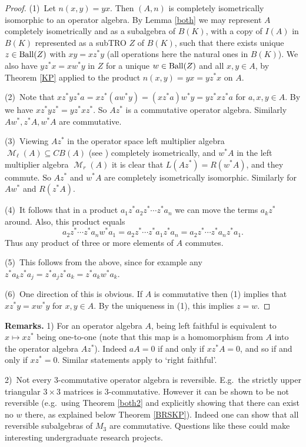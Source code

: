 \documentclass{amsart}
\theoremstyle{remark}
\theoremstyle{definition}
\numberwithin{equation}{section}
\DeclareMathOperator{\cM}{{\mathcal M}}
\begin{document}
\begin{proof}  (1)\ Let $n(x,y) = yx$.  Then $(A,n)$ is completely isometrically isomorphic to an operator algebra. By Lemma \ref{both}
we may represent 
$A$ completely isometrically and as a subalgebra of $B(K)$, with a copy of 
$I(A)$ in $B(K)$ represented as a subTRO $Z$ of $B(K)$, such that there exists unique $z \in {\rm Ball}(Z)$ with
$xy = x z^*y$ (all operations here the natural ones in $B(K)$).   We also have $y z^* x = x w^* y$ in $Z$ 
for a unique $w \in {\rm Ball}(Z)$ and all $x, y \in A$, by Theorem \ref{KP} 
applied to the product $n(x,y) = yx = y z^* x$ on $A$.   

(2)\ Note that $x z^* yz^* a = x z^* (a w^* y) = (x z^* a) w^* y = y z^* x z^* a$ for $a,x,y \in A$.   By \cite[Proposition 4.4.12]{BLM}  we have 
 $x z^* yz^* = y z^* x z^*$.   So $Az^*$ is a  commutative operator algebra.  Similarly $Aw^*, z^* A, w^* A$ are
 commutative.   
 
 (3)\ Viewing $Az^*$ in the operator space left multiplier algebra $\cM_\ell(A) \subseteq CB(A)$ (see \cite[Chapter 4]{BLM}) completely isometrically, and $w^* A$ in the left multiplier algebra
$\cM_r(A)$ it is clear that $L(Az^*) = R(w^* A)$, and they commute.   So $Az^*$ and $w^*A$ are completely isometrically isomorphic.
Similarly for $Aw^*$ and $R(z^* A)$.  
 
(4)\ It follows that in a product $a_1 z^* a_2 z^* \cdots z^* a_n$ we can 
 move the terms $a_k z^*$ around.   Also, this product equals $$a_2 z^* \cdots z^* a_n w^* a_1 = a_2 z^* \cdots z^* a_1 z^* a_n
 = a_2 z^* \cdots z^* a_n z^* a_1.$$ Thus any  product of three or more elements of $A$ commutes. 
 

(5)\ This  follows from the above, since for example any $z^* a_k z^* a_j = z^* a_j z^* a_k = z^* a_k w^* a_k$. 

(6)\ One direction of this is obvious.
If $A$ is commutative 
then (1) implies that $x z^*y = x w^* y$ for $x, y \in A$.  By the uniqueness in (1), this implies $z=w$.
\end{proof} 

{\bf Remarks.} 1) For an operator algebra  $A$, being  left faithful is equivalent to $x \mapsto xz^*$ being one-to-one (note that this map is a homomorphism from $A$ into the operator algebra $Az^*$).  Indeed $aA = 0$ if and only if $xz^* A = 0$, and so if and only if $xz^* = 0$.  Similar statements apply to `right faithful'.

\medskip

2)\ Not every  3-commutative operator algebra is reversible. E.g.\ the strictly upper triangular $3 \times 3$ matrices is 3-commutative.
However it can be shown to be not reversible (e.g.\ using Theorem \ref{both2}
and explicitly showing that there can exist no 
$w$ there, as explained below Theorem \ref{BRSKP}).   Indeed one can show that all reversible subalgebras of $M_3$ are commutative.  Questions like these could make interesting undergraduate research projects.   
\end{document}
